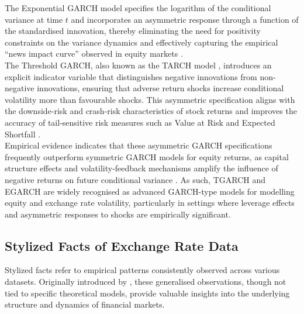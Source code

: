 \documentclass[oneside,12pt]{CUEDthesisPSnPDF}
\newcommand{\textcite}{\citet}
\newcommand{\parencite}{\citep}
\begin{document}
The Exponential GARCH model \parencite{nelson1991conditional} specifies the logarithm of the conditional variance at time $t$ and incorporates an asymmetric response through a function of the standardised innovation, thereby eliminating the need for positivity constraints on the variance dynamics and effectively capturing the empirical ``news impact curve'' observed in equity markets \parencite{engle1993measuring}. \\

The Threshold GARCH, also known as the TARCH model \parencite{zakoian1994threshold}, introduces an explicit indicator variable that distinguishes negative innovations from non-negative innovations, ensuring that adverse return shocks increase conditional volatility more than favourable shocks. This asymmetric specification aligns with the downside-risk and crash-risk characteristics of stock returns and improves the accuracy of tail-sensitive risk measures such as Value at Risk and Expected Shortfall \parencite{hansen1994autoregressive,bauwens2006multivariate}. \\

Empirical evidence indicates that these asymmetric GARCH specifications frequently outperform symmetric GARCH models for equity returns, as capital structure effects and volatility-feedback mechanisms amplify the influence of negative returns on future conditional variance \parencite{campbell1992no}. As such, TGARCH and EGARCH are widely recognised as advanced GARCH-type models for modelling equity and exchange rate volatility, particularly in settings where leverage effects and asymmetric responses to shocks are empirically significant.\\



\subsection{Stylized Facts of Exchange Rate Data}
\noindent 
Stylized facts refer to empirical patterns consistently observed across various datasets. Originally introduced by \textcite{cont2001empirical}, these generalised observations, though not tied to specific theoretical models, provide valuable insights into the underlying structure and dynamics of financial markets.\\
\end{document}
